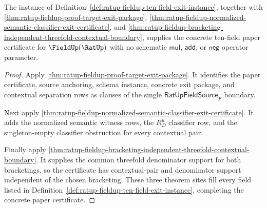 \begin{theorem}
\label{thm:ratup-fieldup-ten-field-exit-certificate}
The instance of
Definition~\ref{def:ratup-fieldup-ten-field-exit-instance}, together with
\autoref{thm:ratup-fieldup-proof-target-exit-package},
\autoref{thm:ratup-fieldup-normalized-semantic-classifier-exit-certificate}, and
\autoref{thm:ratup-fieldup-bracketing-independent-threefold-contextual-boundary},
supplies the concrete ten-field paper certificate for $\FieldUp(\RatUp)$ with no
schematic $\mathsf{mul}$, $\mathsf{add}$, or $\mathsf{neg}$ operator parameter.
\end{theorem}
\begin{proof}
Apply \autoref{thm:ratup-fieldup-proof-target-exit-package}. It identifies the
paper certificate, source anchoring, schema instance, concrete exit package, and
contextual separation rows as clauses of the single
$\mathsf{RatUpFieldSource}_F$ boundary.

Next apply
\autoref{thm:ratup-fieldup-normalized-semantic-classifier-exit-certificate}. It
adds the normalized semantic witness rows, the $R_D^u$ classifier row, and the
singleton-empty classifier obstruction for every contextual pair.

Finally apply
\autoref{thm:ratup-fieldup-bracketing-independent-threefold-contextual-boundary}.
It supplies the common threefold denominator support for both bracketings, so the
certificate has contextual-pair and denominator support independent of the
chosen bracketing. These three theorem sites fill every field listed in
Definition~\ref{def:ratup-fieldup-ten-field-exit-instance}, completing the concrete
paper certificate.
\end{proof}

